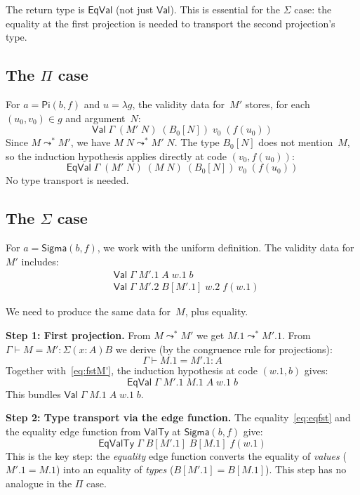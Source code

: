 \documentclass[11pt]{article}
\newcommand{\conveq}[4]{#1 \vdash #2 = #3 : #4}
\newcommand{\App}[2]{#1\;#2}
\newcommand{\substone}[2]{#1[#2]}
\newcommand{\PiC}[2]{\mathsf{Pi}(#1,#2)}
\newcommand{\SigmaC}[2]{\mathsf{Sigma}(#1,#2)}
\newcommand{\Red}{\mathrel{\leadsto^*}}
\newcommand{\Sigmatype}[2]{\Sigma(#1)#2}
\newcommand{\Val}{\mathsf{Val}}
\newcommand{\EqVal}{\mathsf{EqVal}}
\newcommand{\ValTy}{\mathsf{ValTy}}
\newcommand{\EqValTy}{\mathsf{EqValTy}}
\newcommand{\pj}[2]{#1\mbox{.}#2}
\begin{document}
\begin{remark}
The return type is $\EqVal$ (not just $\Val$).  This is essential
for the $\Sigma$ case: the equality at the first projection is needed to
transport the second projection's type.
\end{remark}

\subsection{The $\Pi$ case}

For $a = \PiC{b}{f}$ and $u = \lambda g$, the validity data for~$M'$
stores, for each $(u_0, v_0) \in g$ and argument~$N$:
\[
  \Val\;\Gamma\;(\App{M'}{N})\;(\substone{B_0}{N})\;v_0\;(f(u_0))
\]
Since $M \Red M'$, we have $\App{M}{N} \Red \App{M'}{N}$.
The type $\substone{B_0}{N}$ does not mention~$M$, so the induction hypothesis
applies directly at code $(v_0, f(u_0))$:
\[
  \EqVal\;\Gamma\;(\App{M'}{N})\;(\App{M}{N})\;(\substone{B_0}{N})\;v_0\;(f(u_0))
\]
No type transport is needed.

\subsection{The $\Sigma$ case}\label{sec:sigma}

For $a = \SigmaC{b}{f}$, we work with the uniform definition.
The validity data for~$M'$ includes:
\begin{align}
  &\Val\;\Gamma\;\pj{M'}{1}\;A\;\pj{w}{1}\;b  \label{eq:fstM'}\\
  &\Val\;\Gamma\;\pj{M'}{2}\;\substone{B}{\pj{M'}{1}}\;\pj{w}{2}\;f(\pj{w}{1})
    \label{eq:sndM'}
\end{align}

We need to produce the same data for~$M$, plus equality.

\medskip
\noindent\textbf{Step 1: First projection.}
From $M \Red M'$ we get $\pj{M}{1} \Red \pj{M'}{1}$.  From
$\conveq{\Gamma}{M}{M'}{\Sigmatype{x{:}A}{B}}$ we derive (by the congruence
rule for projections):
\[
  \conveq{\Gamma}{\pj{M}{1}}{\pj{M'}{1}}{A}
\]
Together with~\eqref{eq:fstM'}, the induction hypothesis at code
$(\pj{w}{1}, b)$ gives:
\begin{equation}\label{eq:eqfst}
  \EqVal\;\Gamma\;\pj{M'}{1}\;\pj{M}{1}\;A\;\pj{w}{1}\;b
\end{equation}
This bundles $\Val\;\Gamma\;\pj{M}{1}\;A\;\pj{w}{1}\;b$.

\medskip
\noindent\textbf{Step 2: Type transport via the edge function.}
The equality~\eqref{eq:eqfst} and the equality edge function from $\ValTy$ at
$\SigmaC{b}{f}$ give:
\begin{equation}\label{eq:eqty}
  \EqValTy\;\Gamma\;\substone{B}{\pj{M'}{1}}\;\substone{B}{\pj{M}{1}}\;f(\pj{w}{1})
\end{equation}
This is the key step: the \emph{equality} edge function converts the equality of
\emph{values} ($\pj{M'}{1} = \pj{M}{1}$) into an equality of \emph{types}
($\substone{B}{\pj{M'}{1}} = \substone{B}{\pj{M}{1}}$).  This step has no
analogue in the $\Pi$ case.
\end{document}

